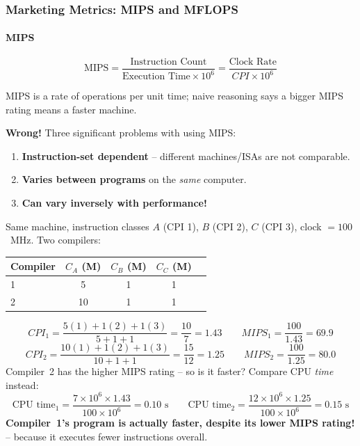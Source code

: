 \subsubsection{Marketing Metrics: MIPS and MFLOPS}
\label{sec:mips-mflops}

\paragraph{MIPS}
\begin{definition}
\[
  \text{MIPS} = \frac{\text{Instruction Count}}{\text{Execution Time}
  \times 10^6} = \frac{\text{Clock Rate}}{CPI \times 10^6}
\]
\end{definition}
MIPS is a rate of operations per unit time; naive reasoning says a bigger
MIPS rating means a faster machine.

\textbf{Wrong!} Three significant problems with using MIPS:
\begin{enumerate}
  \item \textbf{Instruction-set dependent} -- different machines/ISAs are
  not comparable.
  \item \textbf{Varies between programs} on the \emph{same} computer.
  \item \textbf{Can vary inversely with performance!}
\end{enumerate}

\begin{eg}
Same machine, instruction classes $A$ (CPI 1), $B$ (CPI 2), $C$ (CPI 3),
clock $=100$~MHz. Two compilers:
\begin{center}
\begin{tabular}{@{}lcccc@{}}
\toprule
Compiler & $C_A$ (M) & $C_B$ (M) & $C_C$ (M) \\
\midrule
1 & 5  & 1 & 1 \\
2 & 10 & 1 & 1 \\
\bottomrule
\end{tabular}
\end{center}
\[
  CPI_1 = \frac{5(1)+1(2)+1(3)}{5+1+1} = \frac{10}{7} = 1.43
  \qquad MIPS_1 = \frac{100}{1.43} = 69.9
\]
\[
  CPI_2 = \frac{10(1)+1(2)+1(3)}{10+1+1} = \frac{15}{12} = 1.25
  \qquad MIPS_2 = \frac{100}{1.25} = 80.0
\]
Compiler~2 has the higher MIPS rating -- so is it faster? Compare CPU
\emph{time} instead:
\[
  \text{CPU time}_1 = \frac{7\times10^6\times1.43}{100\times10^6} = 0.10\text{ s}
  \qquad
  \text{CPU time}_2 = \frac{12\times10^6\times1.25}{100\times10^6} = 0.15\text{ s}
\]
\textbf{Compiler~1's program is actually faster, despite its lower MIPS
rating!} -- because it executes fewer instructions overall.
\end{eg}

